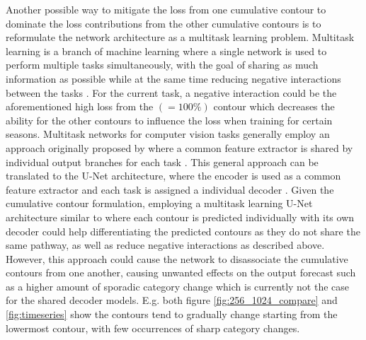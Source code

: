 \documentclass[../main/thesis]{subfiles}
\begin{document}
Another possible way to mitigate the loss from one cumulative contour to dominate the loss contributions from the other cumulative contours is to reformulate the network architecture as a multitask learning problem. Multitask learning is a branch of machine learning where a single network is used to perform multiple tasks simultaneously, with the goal of sharing as much information as possible while at the same time reducing negative interactions between the tasks \citep{Crawshaw2020}. For the current task, a negative interaction could be the aforementioned high loss from the $(=100\%)$ contour which decreases the ability for the other contours to influence the loss when training for certain seasons. Multitask networks for computer vision tasks generally employ an approach originally proposed by \citet{Zhang2014} where a common feature extractor is shared by individual output branches for each task \citep{Crawshaw2020}. This general approach can be translated to the U-Net architecture, where the encoder is used as a common feature extractor and each task is assigned a individual decoder \citep{Jha2020}. Given the cumulative contour formulation, employing a multitask learning U-Net architecture similar to \citet{Jha2020} where each contour is predicted individually with its own decoder could help differentiating the predicted contours as they do not share the same pathway, as well as reduce negative interactions as described above. However, this approach could cause the network to disassociate the cumulative contours from one another, causing unwanted effects on the output forecast such as a higher amount of sporadic category change which is currently not the case for the shared decoder models. E.g. both figure \ref{fig:256_1024_compare} and \ref{fig:timeseries} show the contours tend to gradually change starting from the lowermost contour, with few occurrences of sharp category changes.
\end{document}
